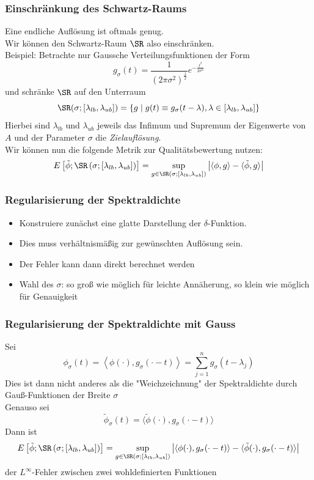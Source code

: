\begin{frame}
    \frametitle{Einschränkung des Schwartz-Raums}
    Eine endliche Auflösung ist oftmals genug.\\
    Wir können den Schwartz-Raum $\SR$ also einschränken.\\
    Beispiel: Betrachte nur Gaussche Verteilungsfunktionen der Form
    $$g_{\sigma}(t) = \frac{1}{(2\pi\sigma^2)^\frac{1}{2}}e^{-\frac{t^2}{2\sigma^2}}$$
    und schränke $\SR$ auf den Unterraum
    $$\SR(\sigma;[\lambda_{lb}, \lambda_{ub}]) = \left\{ g \mid g(t) \equiv g_{\sigma}(t - \lambda), \lambda \in [\lambda_{lb}, \lambda_{ub}] \right\}$$
    Hierbei sind $\lambda_{lb}$ und $\lambda_{ub}$ jeweils das Infimum und Supremum der Eigenwerte von $A$ und der Parameter $\sigma$ die \emph{Zielauflösung}.\\
    Wir können nun die folgende Metrik zur Qualitätsbewertung nutzen:
    \begin{equation} \label{eq:error}
        E\left[\tilde{\phi};\SR\left(\sigma; \left[\lambda_{lb}, \lambda_{ub} \right] \right)\right] = \sup_{g \in \SR(\sigma;[\lambda_{lb}, \lambda_{ub}])} \left| \langle \phi, g \rangle - \langle \tilde{\phi}, g \rangle \right|
    \end{equation}
\end{frame}

\begin{frame}
    \frametitle{Regularisierung der Spektraldichte}
    \begin{itemize}
        \item Konstruiere zunächst eine glatte Darstellung der $\delta$-Funktion.
        \item Dies muss verhältnismäßig zur gewünschten Auflösung sein.
        \item Der Fehler kann dann direkt berechnet werden
        \item Wahl des $\sigma$: so groß wie möglich für leichte Annäherung, so klein wie möglich für Genauigkeit
    \end{itemize}
\end{frame}

\begin{frame}
    \frametitle{Regularisierung der Spektraldichte mit Gauss}
    Sei $$\phi_{\sigma}(t) = \left \langle \phi(\cdot), g_{\sigma}(\cdot - t)\right \rangle = \sum_{j = 1}^n g_{\sigma}(t - \lambda_j)$$
    Dies ist dann nicht anderes als die "Weichzeichnung" der Spektraldichte durch Gauß-Funktionen der Breite $\sigma$\\
    Genauso sei $$\tilde{\phi}_{\sigma}(t) = \langle \tilde{\phi}(\cdot), g_{\sigma}(\cdot - t) \rangle$$
    Dann ist
    $$E\left[\tilde{\phi};\SR\left(\sigma; \left[\lambda_{lb}, \lambda_{ub} \right] \right)\right] = \sup_{g \in \SR(\sigma;[\lambda_{lb}, \lambda_{ub}])} \left| \langle \phi(\cdot), g_{\sigma}(\cdot - t) \rangle - \langle \tilde{\phi}(\cdot), g_{\sigma}(\cdot - t) \rangle \right|$$
    der $L^\infty$-Fehler zwischen zwei wohldefinierten Funktionen
\end{frame}

